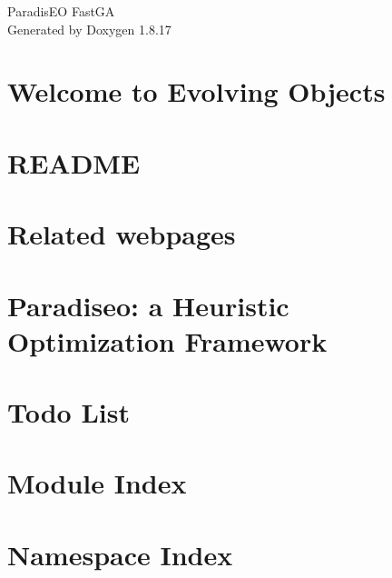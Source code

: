\let\mypdfximage\pdfximage\def\pdfximage{\immediate\mypdfximage}\documentclass[twoside]{book}
\newcommand{\+}{\discretionary{\mbox{\scriptsize$\hookleftarrow$}}{}{}}
\newcommand{\clearemptydoublepage}{%
  \newpage{\pagestyle{empty}\cleardoublepage}%
}
\begin{document}
\hypersetup{pageanchor=false,
             bookmarksnumbered=true,
             pdfencoding=unicode
            }
\begin{titlepage}
\vspace*{7cm}
\begin{center}%
{\Large Paradis\+EO Fast\+GA }\\
\vspace*{1cm}
{\large Generated by Doxygen 1.8.17}\\
\end{center}
\end{titlepage}
\clearemptydoublepage
{}
\tableofcontents
\clearemptydoublepage
{}
\hypersetup{pageanchor=true}

\chapter{Welcome to Evolving Objects}
\label{index}\hypertarget{index}{}
\chapter{R\+E\+A\+D\+ME}
\label{md_eo_test_mpi__d_i_s_t_r_i_b__x_p__r_e_a_d_m_e}

\chapter{Related webpages}
\label{webpages}

\chapter{Paradiseo\+: a Heuristic Optimization Framework}
\label{md__r_e_a_d_m_e}

\chapter{Todo List}
\label{todo}

\chapter{Module Index}

\chapter{Namespace Index}

\end{document}
